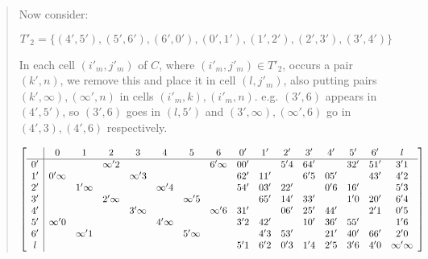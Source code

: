\documentclass[
  11pt,
  a4paper]{book}
\begin{document}
\begin{quote}
Now consider:

\begin{equation}
T'_2 = \{(4', 5'), (5', 6'), (6', 0'), (0', 1'), (1', 2'), (2', 3'), (3', 4')\}
\end{equation}

In each cell $(i'_m, j'_m)$ of $C$, where
$(i'_m,j'_m) \in T'_2$, occurs a pair $(k', n)$,
we remove this and place it in cell $(l, j'_m)$,
also putting pairs $(k', \infty), (\infty ', n)$ in cells
$(i'_m, k), (i'_m, n)$.
e.g.
$(3', 6)$ appears in $(4', 5')$, so $(3', 6)$ goes in
$(l, 5')$ and $(3', \infty), (\infty ', 6)$ go in
$(4', 3), (4', 6)$ respectively.

\begin{equation}
  \left[\begin{array}{c|*{15}c}
        &      0       &      1       &      2       &      3       &      4       &      5       &      6       &  0'   &  1'   &  2'   &  3'   &  4'   &  5'   &  6'    &        l         \\ \hline
    0'  &              &              &  \infty ' 2  &              &              &              &  6' \infty   &  00'  &       &  5'4  &  64'  &       &  32'  &  51'   &       3'1        \\
    1'  &  0' \infty   &              &              &  \infty ' 3  &              &              &              &  62'  &  11'  &       &  6'5  &  05'  &       &  43'   &       4'2        \\
    2'  &              &  1' \infty   &              &              &  \infty ' 4  &              &              &  54'  &  03'  &  22'  &       &  0'6  &  16'  &        &       5'3        \\
    3'  &              &              &  2' \infty   &              &              &  \infty ' 5  &              &       &  65'  &  14'  &  33'  &       &  1'0  &  20'   &       6'4        \\
    4'  &              &              &              &  3' \infty   &              &              &  \infty ' 6  &  31'  &       &  06'  &  25'  &  44'  &       &  2'1   &       0'5        \\
    5'  &  \infty ' 0  &              &              &              &  4' \infty   &              &              &  3'2  &  42'  &       &  10'  &  36'  &  55'  &        &       1'6        \\
    6'  &              &  \infty ' 1  &              &              &              &  5' \infty   &              &       &  4'3  &  53'  &       &  21'  &  40'  &  66'   &       2'0        \\
    l   &              &              &              &              &              &              &              &  5'1  &  6'2  &  0'3  &  1'4  &  2'5  &  3'6  &  4'0   & \infty ' \infty  \\
  \end{array}\right]
\end{equation}


\end{quote}
\end{document}

